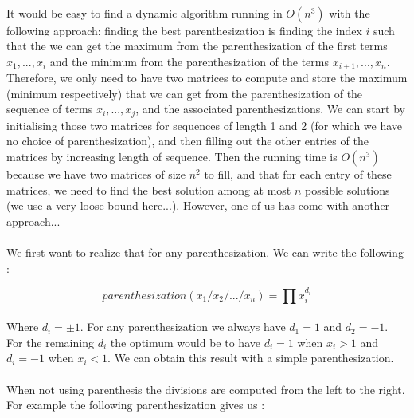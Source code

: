 \paragraph{}
It would be easy to find a dynamic algorithm running in $O(n^3)$ with the following approach: finding the best parenthesization is finding the index $i$ such that the we can get the maximum from the parenthesization of the first terms $x_1,...,x_i$ and the minimum from the parenthesization of the terms $x_{i+1},...,x_n$.
\newline
Therefore, we only need to have two matrices to compute and store the maximum (minimum respectively) that we can get from the parenthesization of the sequence of terms $x_i,...,x_j$, and the associated parenthesizations.
\newline
We can start by initialising those two matrices for sequences of length 1 and 2 (for which we have no choice of parenthesization), and then filling out the other entries of the matrices by increasing length of sequence.
\newline
Then the running time is $O(n^3)$ because we have two matrices of size $n^2$ to fill, and that for each entry of these matrices, we need to find the best solution among at most $n$ possible solutions (we use a very loose bound here...).
\newline
However, one of us has come with another approach...
\paragraph{}
We first want to realize that for any parenthesization. We can write the following : 

\[parenthesization(x_1/x_2/.../x_n) = \prod x_i^{d_i}\]

\paragraph{}
Where $d_i = \pm 1$. For any parenthesization we always have $d_1 = 1$ and $d_2 = -1$. For the remaining $d_i$ the optimum would be to have $d_i = 1$ when $x_i > 1$ and $d_i = -1$ when $x_i < 1$. We can obtain this result with a simple parenthesization. 

\paragraph{}
When not using parenthesis the divisions are computed from the left to the right. For example the following parenthesization gives us : 

